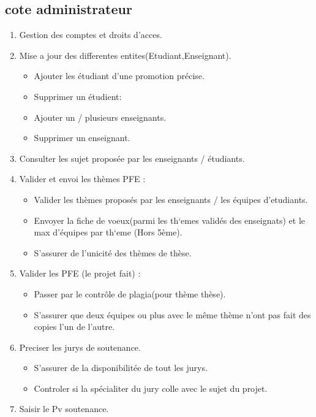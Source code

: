 \documentclass[11pt,fleqn]{book} %
\begin{document}
\subsection{cote administrateur} 
\begin{enumerate}
    \item Gestion des comptes et droits d’acces.
    \item Mise a jour des differentes entites(Etudiant,Enseignant).
    \begin{itemize}
        \item Ajouter les étudiant d’une promotion précise.
        \item Supprimer un étudient:
        \item Ajouter un / plusieurs enseignants.
        \item Supprimer un enseignant.
    \end{itemize}
    \item Consulter les sujet proposée par les enseignants / étudiants.
    \item Valider et envoi les thèmes PFE :
    \begin{itemize}
        \item Valider les thèmes proposés par les enseignants / les équipes d’etudiants.
        \item Envoyer la fiche de voeux(parmi les th`emes validés des enseignats) et le max d’équipes par th`eme (Hors 5ème).
        \item S’assurer de l’unicité des thèmes de thèse.
    \end{itemize}
     \item Valider les PFE (le projet fait) :
     \begin{itemize}
         \item Passer par le contrôle  de plagia(pour thème thèse).
         \item S’assurer que deux équipes ou plus avec le même   thème n’ont pas fait des copies l’un de l’autre.
     \end{itemize}
     \item Preciser les jurys de soutenance.
     \begin{itemize}
         \item S’assurer de la disponibilitée de tout les jurys.
         \item Controler si la spécialiter du jury colle avec le sujet du projet.    
     \end{itemize}
     \item Saisir le Pv soutenance.
\end{enumerate}
\end{document}
